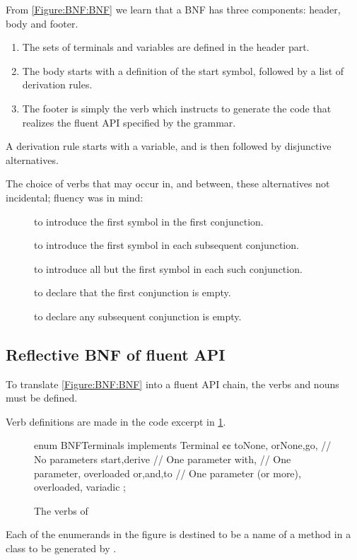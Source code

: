From \cref{Figure:BNF:BNF} we learn
  that a BNF has three components: header, body and footer.
  \begin{enumerate}
    \item The sets of terminals and variables are defined in the header part.
    \item The body starts with a definition of the start symbol, followed by a list of derivation
  rules.
\item The footer is simply the verb  which instructs \Self
  to generate the code that realizes the fluent API specified by the grammar.
  \end{enumerate}

A derivation rule starts with a variable, and is then followed by disjunctive alternatives.

The choice of verbs that may occur in, and between, these alternatives not incidental;
  fluency was in mind:
\begin{description}
  \item[] to introduce the first symbol in the first conjunction.
  \item[] to introduce the first symbol in each subsequent conjunction.
  \item[] to introduce all but the first symbol in each such conjunction.
  \item[] to declare that the first conjunction is empty.
  \item[] to declare any subsequent conjunction is empty.
\end{description}

\subsection{Reflective BNF of fluent API}

To translate \cref{Figure:BNF:BNF} into a fluent
API chain, the verbs and nouns must be defined.

Verb definitions are made in the code excerpt in
\cref{Figure:Verbs}.

\begin{figure}[h]
  \begin{JAVA}[style=code]
enum BNFTerminals implements Terminal {¢¢
  toNone, orNone,go, // No parameters
  start,derive // One parameter
  with, // One parameter, overloaded
  or,and,to // One parameter (or more), overloaded, variadic
  ;
}\end{JAVA}
  \caption{The verbs of \Self}
  \label{Figure:Verbs}
\end{figure}
Each of the enumerands in the figure is destined to be a
  name of a method in a class to be generated by \Self.


